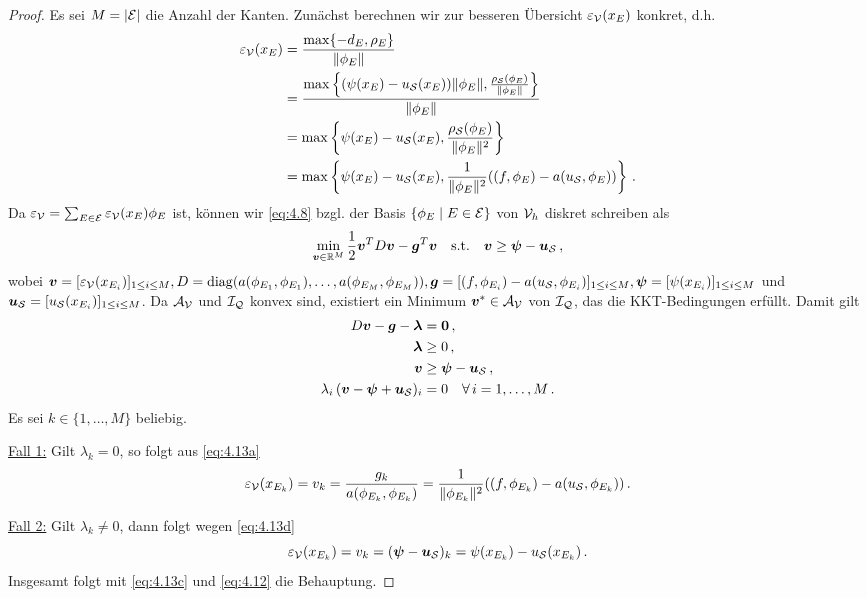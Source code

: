 \begin{proof}
Es sei $M = \lvert \mathcal E\rvert$ die Anzahl der Kanten. Zunächst berechnen wir zur besseren Übersicht $\varepsilon_{\mathcal V}(x_E)$ konkret, d.h.
\begin{align}\notag
	\varepsilon_{\mathcal V} (x_E) & =  \frac{\max \{-d_E,\rho_E\}}{\lVert \phi_E\rVert} \\
	\notag
	& = \frac{\max \left\{(\psi (x_E)-u_{\mathcal S}(x_E) )\lVert \phi_E\rVert ,\frac{\rho_{\mathcal S}(\phi_E)}{\lVert \phi_E\rVert}\right\}}{\lVert \phi_E\rVert} \\
	\notag
	& = \max \left\{\psi (x_E)-u_{\mathcal S}(x_E)  ,\frac{\rho_{\mathcal S}(\phi_E)}{\lVert \phi_E\rVert^2}\right\} \\
	\label{eq:4.12}
	& = \max \left\{\psi (x_E)-u_{\mathcal S}(x_E)  ,\frac 1{\lVert \phi_E\rVert^2} ((f,\phi_E)-a(u_{\mathcal S},\phi_E))	\right\} \, .
\end{align}
Da  $\varepsilon_{\mathcal V} = \sum_{E \in \mathcal E} \varepsilon_{\mathcal V}(x_E) \phi_E$ ist, können wir \eqref{eq:4.8} bzgl. der Basis $\{\phi_E \mid E \in \mathcal E\}$ von $\mathcal V_h$ diskret schreiben als
\begin{align*}
	\min_{\boldsymbol v \in \mathbb{R}^M} \frac 1 2 \boldsymbol v^T D \boldsymbol v - \boldsymbol g^T \boldsymbol v \quad \text{s.t.} \quad\boldsymbol v \ge \boldsymbol \psi - \boldsymbol u_{\mathcal S}\, , 
\end{align*}
wobei $\boldsymbol v = [\varepsilon_{\mathcal V}(x_{E_i})]_{1\le i \le M}, D = \operatorname{diag}(a(\phi_{E_1},\phi_{E_1}),\ldots,a(\phi_{E_M},\phi_{E_M})), \boldsymbol g = [(f,\phi_{E_i})-a(u_{\mathcal S},\phi_{E_i})]_{1\le i\le M}, \boldsymbol \psi = [\psi(x_{E_i})]_{1\le i \le M}$ und $ \boldsymbol u_{\mathcal S} = [u_{\mathcal S}(x_{E_i})]_{1\le i \le M}$. Da $\mathcal A_{\mathcal V}$ und $\mathcal I_{\mathcal Q}$ konvex sind, existiert ein Minimum $\boldsymbol v^* \in \mathcal A_{\mathcal V}$ von $\mathcal I_{\mathcal Q}$, das die KKT-Bedingungen erfüllt. Damit gilt
\begin{subequations}\label{eq:4.13}
\begin{align}\label{eq:4.13a}
	D \boldsymbol v-\boldsymbol g - \boldsymbol \lambda & = \boldsymbol 0 \, , \\
	\label{eq:4.13b}
	\boldsymbol \lambda &\ge 0\, ,\\
	\label{eq:4.13c}
	\boldsymbol v & \ge \boldsymbol \psi - \boldsymbol u_{\mathcal S}\,  , \\
	\label{eq:4.13d}
	\lambda_i\, (\boldsymbol v - \boldsymbol \psi+\boldsymbol u_{\mathcal S})_i &= 0 \quad \forall \, i=1,\ldots,M \, .
\end{align}
\end{subequations}
Es sei $k \in \{1,\ldots,M\}$ beliebig.

\underline{Fall 1:} Gilt $\lambda_k = 0$, so folgt aus \eqref{eq:4.13a}
\[
	\varepsilon_{\mathcal V} (x_{E_k}) = v_k = \frac {g_k}{a(\phi_{E_k},\phi_{E_k})} = \frac 1{\lVert \phi_{E_k}\rVert^2} ((f,\phi_{E_k})-a(u_{\mathcal S},\phi_{E_k})) \, .
\]

\underline{Fall 2:} Gilt $\lambda_k \not= 0$, dann folgt wegen \eqref{eq:4.13d}
\[
	\varepsilon_{\mathcal V} (x_{E_k}) =v_k = (\boldsymbol \psi - \boldsymbol u_{\mathcal S})_k = \psi(x_{E_k}) - u_{\mathcal S}(x_{E_k})\, .
\]
Insgesamt folgt mit \eqref{eq:4.13c} und \eqref{eq:4.12} die Behauptung.
\end{proof}


